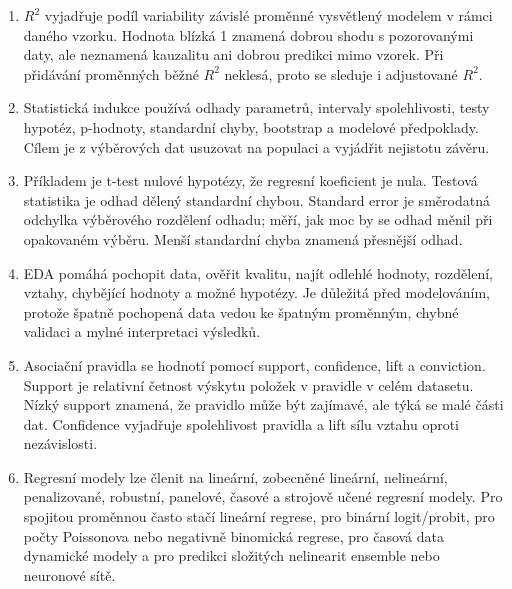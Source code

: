 \documentclass[12pt,a4paper]{article}
\begin{document}
\begin{enumerate}
  \item {}

  $R^2$ vyjadřuje podíl variability závislé proměnné vysvětlený modelem v rámci daného vzorku. Hodnota
  blízká 1 znamená dobrou shodu s pozorovanými daty, ale neznamená kauzalitu ani dobrou predikci mimo
  vzorek. Při přidávání proměnných běžné $R^2$ neklesá, proto se sleduje i adjustované $R^2$.

  \item {}

  Statistická indukce používá odhady parametrů, intervaly spolehlivosti, testy hypotéz, p-hodnoty,
  standardní chyby, bootstrap a modelové předpoklady. Cílem je z výběrových dat usuzovat na populaci
  a vyjádřit nejistotu závěru.

  \item {}

  Příkladem je t-test nulové hypotézy, že regresní koeficient je nula. Testová statistika je odhad
  dělený standardní chybou. Standard error je směrodatná odchylka výběrového rozdělení odhadu; měří,
  jak moc by se odhad měnil při opakovaném výběru. Menší standardní chyba znamená přesnější odhad.

  \item {}

  EDA pomáhá pochopit data, ověřit kvalitu, najít odlehlé hodnoty, rozdělení, vztahy, chybějící
  hodnoty a možné hypotézy. Je důležitá před modelováním, protože špatně pochopená data vedou ke
  špatným proměnným, chybné validaci a mylné interpretaci výsledků.

  \item {}

  Asociační pravidla se hodnotí pomocí support, confidence, lift a conviction. Support je relativní
  četnost výskytu položek v pravidle v celém datasetu. Nízký support znamená, že pravidlo může být
  zajímavé, ale týká se malé části dat. Confidence vyjadřuje spolehlivost pravidla a lift sílu vztahu
  oproti nezávislosti.

  \item {}

  Regresní modely lze členit na lineární, zobecněné lineární, nelineární, penalizované, robustní,
  panelové, časové a strojově učené regresní modely. Pro spojitou proměnnou často stačí lineární
  regrese, pro binární logit/probit, pro počty Poissonova nebo negativně binomická regrese, pro časová
  data dynamické modely a pro predikci složitých nelinearit ensemble nebo neuronové sítě.


\end{enumerate}
\end{document}
